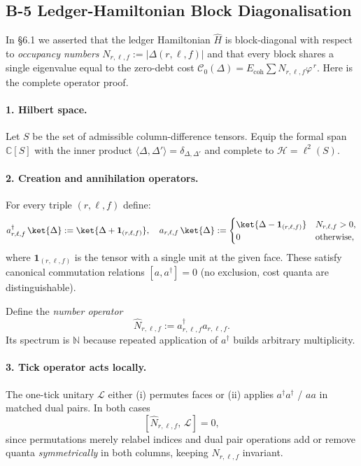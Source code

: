 \documentclass[11pt]{article}
\begin{document}
\subsection*{B-5 Ledger-Hamiltonian Block Diagonalisation}
\label{app:block}

In §6.1 we asserted that the ledger Hamiltonian $\widehat H$ is
block-diagonal with respect to \emph{occupancy numbers}
$N_{r,\ell,f} := |\Delta(r,\ell,f)|$ and that every block shares a single
eigenvalue equal to the zero-debt cost
$\mathcal C_{0}(\Delta) = E_{\text{coh}}\sum N_{r,\ell,f}\varphi^{\,r}$.
Here is the complete operator proof.

\paragraph{1. Hilbert space.}
Let $S$ be the set of admissible column-difference tensors.  
Equip the formal span $\mathbb C[S]$ with the inner product
$\langle \Delta,\Delta'\rangle = \delta_{\Delta,\Delta'}$ and complete to
$\mathcal H = \ell^{2}(S)$.

\paragraph{2. Creation and annihilation operators.}
For every triple $(r,\ell,f)$ define:
\[
a_{r,\ell,f}^{\dagger}\,\ket{\Delta}
 := \ket{\Delta + \mathbf 1_{(r,\ell,f)}},\quad
a_{r,\ell,f}\,\ket{\Delta}
 := \begin{cases}
      \ket{\Delta - \mathbf 1_{(r,\ell,f)}} & N_{r,\ell,f}>0,\\
      0 & \text{otherwise,}
    \end{cases}
\]
where $\mathbf 1_{(r,\ell,f)}$ is the tensor with a single unit at the
given face.  These satisfy canonical commutation relations
$[a,a^\dagger]=0$ (no exclusion, cost quanta are distinguishable).

Define the \emph{number operator}
\[
\widehat N_{r,\ell,f} := a_{r,\ell,f}^{\dagger}a_{r,\ell,f}.
\]
Its spectrum is $\mathbb N$ because repeated application of
$a^\dagger$ builds arbitrary multiplicity.

\paragraph{3. Tick operator acts locally.}
The one-tick unitary $\mathcal L$ either (i) permutes faces or
(ii) applies $a^\dagger a^\dagger$ / $aa$ in matched dual pairs.  
In both cases
\[
[\widehat N_{r,\ell,f},\,\mathcal L]=0,
\]
since permutations merely relabel indices and dual pair operations add
or remove quanta \emph{symmetrically} in both columns, keeping $N_{r,\ell,f}$
invariant.
\end{document}
